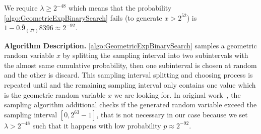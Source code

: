 We require $\lambda\geq 2^{-48}$ which means that the probability \autoref{algo:GeometricExpBinarySearch} fails (to generate $x>2^{52}$) is $ 1- 0.\overline{9}_{\left(27\right) }8396 \approx 2^{-92}$.

\textbf{Algorithm Description. }
\autoref{algo:GeometricExpBinarySearch} samples a geometric random variable $x$ by splitting the sampling interval into two subintervals with the almost same cumulative probability, then one subinterval is chosen at random and the other is discard. This sampling interval splitting and choosing process is repeated until and the remaining sampling interval only contains one value which is the geometric random variable $x$ we are looking for. In original work~\cite{googleDP2019}, the sampling algorithm additional checks if the generated random variable exceed the sampling interval $\left[0,  2^{63}-1\right] $, that is not necessary in our case because we set $\lambda>2^{-48}$ such that it happens with low probability $p \approx 2^{-92}$.

